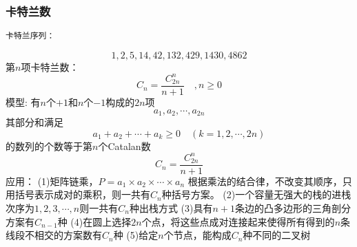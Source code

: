 \subsubsection{卡特兰数}
\begin{verbatim}卡特兰序列：\end{verbatim}
$$1,2,5,14,42,132,429,1430,4862$$ \newline
第$n$项卡特兰数：$$C_n=\frac{C_{2n}^n}{n+1} \quad, n\geq 0$$ \newline
模型: 有$n$个$+1$和$n$个$-1$构成的$2n$项 $$a_1,a_2,\cdots ,a_{2n}$$
其部分和满足 $$a_1+a_2+\cdots+a_k\geq 0 \quad (k=1,2,\cdots,2n)$$
的数列的个数等于第$n$个Catalan数$$C_n=\frac{C_{2n}^n}{n+1} $$
应用：\newline
(1)矩阵链乘，$P=a_1\times a_2\times \cdots \times a_n$
根据乘法的结合律，不改变其顺序，只用括号表示成对的乘积，则一共有$C_n$种括号方案。\newline
(2)一个容量无强大的栈的进栈次序为$1,2,3,\cdots,n$则一共有$C_n$种出栈方式 \newline
(3)具有$n+1$条边的凸多边形的三角剖分方案有$C_{n-1}$种 \newline
(4)在圆上选择$2n$个点，将这些点成对连接起来使得所有得到的$n$条线段不相交的方案数有$C_n$种 \newline
(5)给定$n$个节点，能构成$C_n$种不同的二叉树 \newline
